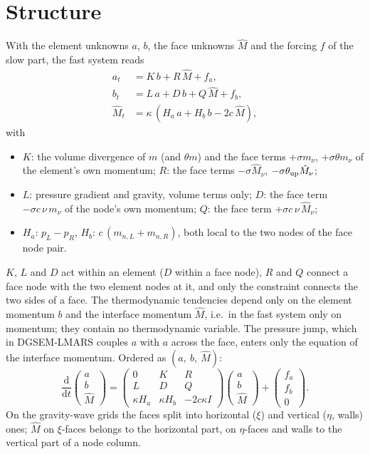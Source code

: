 \documentclass[11pt,a4paper]{article}
\begin{document}
\section{Structure}
With the element unknowns $a$, $b$, the face unknowns $\hat M$ and the forcing $f$ of the slow part, the fast system reads
\begin{align*}
a_t&=K\,b+R\,\hat M+f_a,\\
b_t&=L\,a+D\,b+Q\,\hat M+f_b,\\
\hat M_t&=\kappa\,(H_a\,a+H_b\,b-2c\,\hat M),
\end{align*}
with
\begin{itemize}
\item $K$: the volume divergence of $m$ (and $\theta m$) and the face terms $+\sigma m_\nu$, $+\sigma\theta m_\nu$ of the element's own momentum;
  $R$: the face terms $-\sigma\hat M_\nu$, $-\sigma\theta_{\rm up}\hat M_\nu$;
\item $L$: pressure gradient and gravity, volume terms only; $D$: the face term $-\sigma c\,\nu\,m_\nu$ of the node's own momentum; $Q$: the face
  term $+\sigma c\,\nu\,\hat M_\nu$;
\item $H_a$: $p_L-p_R$, $H_b$: $c\,(m_{n,L}+m_{n,R})$, both local to the two nodes of the face node pair.
\end{itemize}
$K$, $L$ and $D$ act within an element ($D$ within a face node), $R$ and $Q$ connect a face node with the two element nodes
at it, and only the constraint connects the two sides of a face. The thermodynamic tendencies depend only on the
element momentum $b$ and the interface momentum $\hat M$, i.e.\ in the fast system only on momentum; they contain no
thermodynamic variable. The pressure jump, which in DGSEM-LMARS couples $a$ with $a$ across the face, enters only the
equation of the interface momentum. Ordered as $(a,\ b,\ \hat M)$:
\[
\frac{\mathrm d}{\mathrm dt}\begin{pmatrix}a\\b\\\hat M\end{pmatrix}=
\begin{pmatrix}0&K&R\\L&D&Q\\\kappa H_a&\kappa H_b&-2c\kappa I\end{pmatrix}\begin{pmatrix}a\\b\\\hat M\end{pmatrix}+\begin{pmatrix}f_a\\f_b\\0\end{pmatrix}.
\]
On the gravity-wave grids the faces split into horizontal ($\xi$) and vertical ($\eta$, walls) ones; $\hat M$ on $\xi$-faces belongs to
the horizontal part, on $\eta$-faces and walls to the vertical part of a node column.
\end{document}
